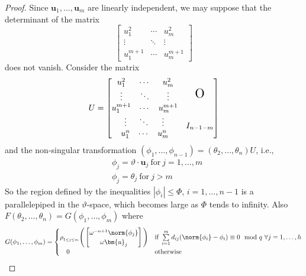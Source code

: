 \documentclass[11pt]{article}
\theoremstyle{definition}
\theoremstyle{proof}
\begin{document}
\begin{proof}
    Since $\bm{u}_1, \ldots, \bm{u}_m$ are linearly independent, we may suppose that the determinant of the matrix
    \[
        \begin{bmatrix}
            u_1^2     & \cdots & u_m^2 \\
            \vdots    & \ddots & \vdots \\
            u_1^{m+1} & \cdots & u_m^{m+1}
        \end{bmatrix}
    \]
    does not vanish.
    Consider the matrix
    \[
        U = \begin{bmatrix}
            \begin{matrix}
                u_1^2     & \cdots & u_m^2 \\
                \vdots    & \ddots & \vdots \\
                u_1^{m+1} & \cdots & u_m^{m+1}
            \end{matrix}
            & \text{\Huge{o}} \\
            \begin{matrix}
                \vdots & \ddots & \vdots \\
                u_1^n  & \cdots & u_m^n
            \end{matrix}
            & I_{n-1-m}
        \end{bmatrix}
    \]
    and the non-singular transformation $(\phi _1, \ldots, \phi _{n-1}) = (\theta _2, \ldots, \theta _{n})U$, i.e.,
    \begin{align*}
        & \phi _j = \vartheta \cdot \bm{u}_j \ \text{for} \ j=1, \ldots, m \\
        & \phi _j = \theta _j \ \text{for} \ j > m
    \end{align*}
    So the region defined by the inequalities $|\phi _i| \leq \Phi $, $i = 1, \ldots, n-1$ is a parallelepiped in the $\vartheta$-space, which becomes large as $\Phi$ tends to infinity.
    Also $F(\theta _2, \ldots, \theta _n) = G(\phi _1, \ldots, \phi _{m})$ where
    \begin{align}\label{G}
        G(\phi _1, \ldots, \phi _m) =
        \begin{cases}
            \rho _{_{1\leq j\leq m}} \Bigg(
            \begin{bmatrix}
                \omega ^{-n+1}\norm{\phi _j} \\
                \omega \bm{u}_j
            \end{bmatrix}
            \Bigg)   & \text{if} \ \sum\limits_{i=1}^{m} d_{ij}(\norm{\phi _i} - \phi _i) \equiv 0 \mod q \ \forall j = 1, \ldots, h \\
            \ \ \ 0  & \text{otherwise}
        \end{cases}
    \end{align}


\end{proof}
\end{document}
